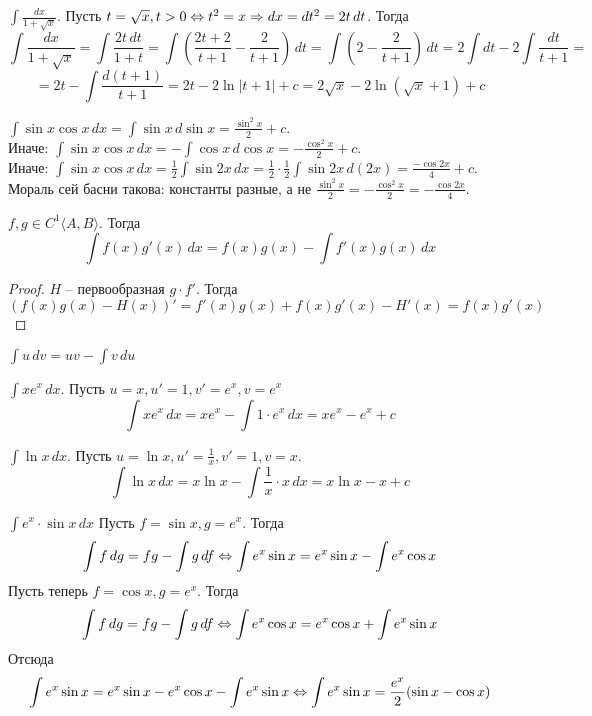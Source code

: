 \begin{Example}
	$\int \frac{dx}{1 + \sqrt{x}}$. Пусть $t = \sqrt{x}, t > 0 \Leftrightarrow t^2 = x \Rightarrow dx = dt^2 = 2t \,dt$. Тогда
	\[\int \frac{dx}{1 + \sqrt{x}} = \int \frac{2t \,dt}{1 + t} = \int \left( \frac{2t + 2}{t + 1} - \frac{2}{t + 1}\right) \,dt = \int \left(2 - \frac{2}{t + 1}\right) \,dt = 2\int dt - 2\int \frac{dt}{t + 1} =\] 
	\[= 2t - \int \frac{d(t + 1)}{t + 1} = 2t - 2\ln |t + 1| + c = 2\sqrt{x} - 2\ln (\sqrt{x} + 1) + c\]
\end{Example}

\begin{Example}
	$\int \sin x \cos x \,dx = \int \sin x \,d\sin x = \frac{\sin^2 x }{2} + c$. \\
	Иначе: $\int \sin x \cos x \,dx = -\int \cos x \,d\cos x = - \frac{\cos^2 x}{2} + c$. \\
	Иначе: $\int \sin x \cos x \,dx = \frac{1}{2} \int \sin 2x \,dx = \frac{1}{2} \cdot \frac{1}{2} \int \sin 2x \,d(2x) = \frac{-\cos 2x}{4} + c$. \\
	Мораль сей басни такова: константы разные, а не $ \frac{\sin^2 x}{2} = - \frac{\cos^2 x}{2} = - \frac{\cos 2x}{4}$. 
\end{Example}

\begin{Thm}
	$f, g \in C^1 \langle A, B\rangle$. Тогда 
	\[\int f(x)g'(x) \,dx = f(x) g(x) - \int f'(x) g(x) \,dx\] 
\end{Thm}

\begin{proof}
	$H$ -- первообразная $g \cdot f'$. Тогда 
	\[(f(x) g(x) - H(x))' = f'(x) g(x) + f(x)g'(x) - H'(x) = f(x)g'(x)\]
\end{proof}

\begin{Rem}
	$\int u \,dv = uv - \int v \,du$
\end{Rem}

\begin{Example}
	$\int x e^x \,dx$. Пусть $u = x, u' = 1, v' = e^x, v = e^x$
	\[\int x e^x \,dx = xe^x - \int 1 \cdot e^x \,dx = x e^x - e^x + c\] 
\end{Example}

\begin{Example}
	$\int \ln x \,dx$. Пусть $u = \ln x, u' = \frac{1}{x}, v' = 1, v = x$.
	\[\int \ln x \,dx = x \ln x - \int \frac{1}{x} \cdot x \,dx = x \ln x - x + c\]  
\end{Example}

\begin{Ex}
	$\int e^x \cdot \sin x \,dx$
	Пусть $f = \sin x, g = e^x$. Тогда
	\[\int f \, dg = fg - \int g \, df \Leftrightarrow \int e^x \sin x = e^x\sin x - \int e^x \cos x\]
	Пусть теперь $f = \cos x, g = e^x$. Тогда
	\[\int f \, dg = fg - \int g \, df \Leftrightarrow \int e^x \cos x = e^x \cos x + \int e^x \sin x\]
	Отсюда 
	\[\int e^x \sin x = e^x\sin x - e^x\cos x - \int e^x \sin x \Leftrightarrow \int e^x\sin x = \frac{e^x}{2}(\sin x - \cos x)\]
\end{Ex}


